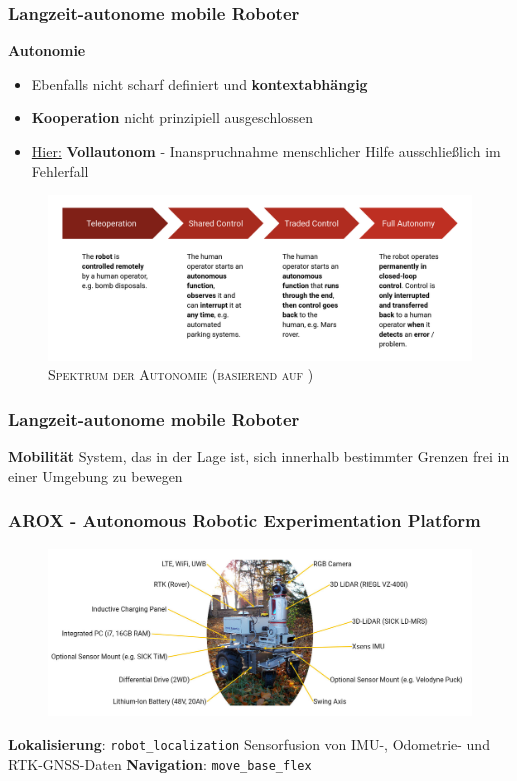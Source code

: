 \documentclass{beamer}
\newcommand{\code}[1]{\colorbox{light-gray}{\texttt{#1}}}
\begin{document}
\begin{frame}
  \frametitle{Langzeit-autonome mobile Roboter}
  \textbf{Autonomie}
  \begin{itemize}
    \item Ebenfalls nicht scharf definiert und \textbf{kontextabhängig}
    \item \textbf{Kooperation} nicht prinzipiell ausgeschlossen
    \item \underline{Hier:} \textbf{Vollautonom} - Inanspruchnahme menschlicher Hilfe ausschließlich im Fehlerfall
  \end{itemize}
  \begin{figure}[H]
    \centering
    \includegraphics[width=\textwidth]{img/autonomy_spectrum.png}
    \caption*{\textsc{Spektrum der Autonomie (basierend auf \cite{Hertzberg:2015})}}
  \end{figure}
\end{frame}

\begin{frame}
  \frametitle{Langzeit-autonome mobile Roboter}
  \textbf{Mobilität}\newline
  System, das in der Lage ist, sich innerhalb bestimmter Grenzen frei in einer Umgebung zu bewegen \cite{Hertzberg:2012}
\end{frame}

\begin{frame}
  \frametitle{AROX - Autonomous Robotic Experimentation Platform}
  \begin{figure}[H]
    \centering
    \includegraphics[width=\textwidth]{img/AROX.jpg}
  \end{figure}
  \textbf{Lokalisierung}: \code{robot\_localization} \cite{Moore:2014}\newline \textrightarrow \thinspace Sensorfusion von IMU-, Odometrie- und RTK-GNSS-Daten\newline
  \textbf{Navigation}: \code{move\_base\_flex} \cite{Puetz:2018}
\end{frame}
\end{document}
